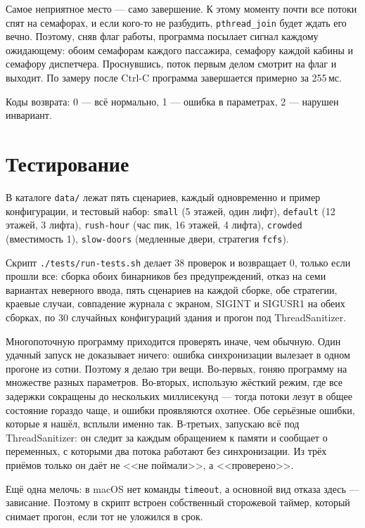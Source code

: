 \documentclass[12pt,a4paper]{article}
\begin{document}
Самое неприятное место --- само завершение. К этому моменту почти все
потоки спят на семафорах, и если кого-то не разбудить, \verb|pthread_join|
будет ждать его вечно. Поэтому, сняв флаг работы, программа посылает
сигнал каждому ожидающему: обоим семафорам каждого пассажира, семафору
каждой кабины и семафору диспетчера. Проснувшись, поток первым делом
смотрит на флаг и выходит. По замеру после Ctrl-C программа завершается
примерно за 255\,мс.

Коды возврата: 0 --- всё нормально, 1 --- ошибка в параметрах, 2 ---
нарушен инвариант.

\section{Тестирование}

В каталоге \verb|data/| лежат пять сценариев, каждый одновременно и
пример конфигурации, и тестовый набор: \verb|small| (5 этажей, один
лифт), \verb|default| (12 этажей, 3 лифта), \verb|rush-hour| (час пик, 16
этажей, 4 лифта), \verb|crowded| (вместимость 1), \verb|slow-doors|
(медленные двери, стратегия \verb|fcfs|).

Скрипт \verb|./tests/run-tests.sh| делает 38 проверок и возвращает 0,
только если прошли все: сборка обоих бинарников без предупреждений, отказ
на семи вариантах неверного ввода, пять сценариев на каждой сборке, обе
стратегии, краевые случаи, совпадение журнала с экраном, SIGINT и SIGUSR1
на обеих сборках, по 30 случайных конфигураций здания и прогон под
ThreadSanitizer.

Многопоточную программу приходится проверять иначе, чем обычную. Один
удачный запуск не доказывает ничего: ошибка синхронизации вылезает в
одном прогоне из сотни. Поэтому я делаю три вещи. Во-первых, гоняю
программу на множестве разных параметров. Во-вторых, использую жёсткий
режим, где все задержки сокращены до нескольких миллисекунд --- тогда
потоки лезут в общее состояние гораздо чаще, и ошибки проявляются
охотнее. Обе серьёзные ошибки, которые я нашёл, всплыли именно так.
В-третьих, запускаю всё под ThreadSanitizer: он следит за каждым
обращением к памяти и сообщает о переменных, с которыми два потока
работают без синхронизации. Из трёх приёмов только он даёт не <<не
поймали>>, а <<проверено>>.

Ещё одна мелочь: в macOS нет команды \verb|timeout|, а основной вид
отказа здесь --- зависание. Поэтому в скрипт встроен собственный
сторожевой таймер, который снимает прогон, если тот не уложился в срок.
\end{document}
